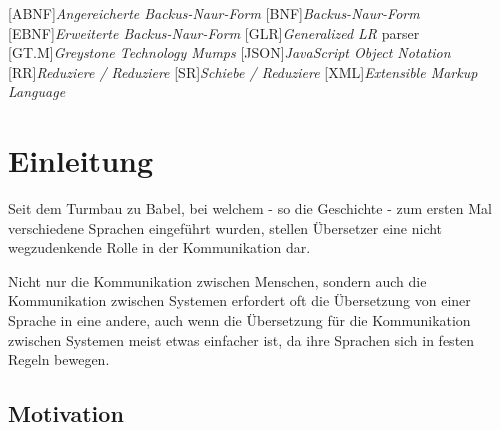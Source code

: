 \documentclass[oneside]{ausarbeitung}
\begin{document}

\listofabbreviations
\begin{acronym}[JSON]  %


[ABNF]{\textit{Angereicherte Backus-Naur-Form}}
[BNF]{\textit{Backus-Naur-Form}}
[EBNF]{\textit{Erweiterte Backus-Naur-Form}}
[GLR]{\textit{Generalized LR} parser}
[GT.M]{\textit{Greystone Technology Mumps}}
[JSON]{\textit{JavaScript Object Notation}}
[RR]{\textit{Reduziere / Reduziere}}
[SR]{\textit{Schiebe / Reduziere}}
[XML]{\textit{Extensible Markup Language}}


\end{acronym}


\cleardoublepage
{}
\setcounter{page}{1}






\chapter{Einleitung}
\label{cha:einleitung}

Seit dem Turmbau zu Babel, bei welchem - so die Geschichte - zum ersten Mal verschiedene Sprachen eingeführt wurden, stellen Übersetzer eine nicht wegzudenkende Rolle in der Kommunikation dar. %


Nicht nur die Kommunikation zwischen Menschen, sondern auch die Kommunikation zwischen Systemen erfordert oft die Übersetzung von einer Sprache in eine andere, auch wenn die Übersetzung für die Kommunikation zwischen Systemen meist etwas einfacher ist, da ihre Sprachen sich in festen Regeln bewegen. 





\section{Motivation}
\label{sec:motivation}
\end{document}

